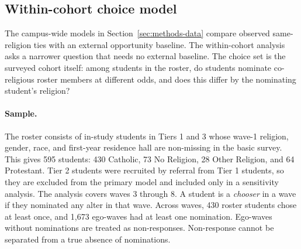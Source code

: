 
\subsection{Within-cohort choice model}
\label{sec:within-cohort-methods}

The campus-wide models in Section~\ref{sec:methods-data} compare observed same-religion ties with an external opportunity baseline. The within-cohort analysis asks a narrower question that needs no external baseline. The choice set is the surveyed cohort itself: among students in the roster, do students nominate co-religious roster members at different odds, and does this differ by the nominating student's religion?

\paragraph{Sample.}
The roster consists of in-study students in Tiers 1 and 3 whose wave-1 religion, gender, race, and first-year residence hall are non-missing in the basic survey. This gives 595 students: 430 Catholic, 73 No Religion, 28 Other Religion, and 64 Protestant. Tier 2 students were recruited by referral from Tier 1 students, so they are excluded from the primary model and included only in a sensitivity analysis. The analysis covers waves 3 through 8. A student is a \emph{chooser} in a wave if they nominated any alter in that wave. Across waves, 430 roster students chose at least once, and 1,673 ego-waves had at least one nomination. Ego-waves without nominations are treated as non-responses. Non-response cannot be separated from a true absence of nominations.

